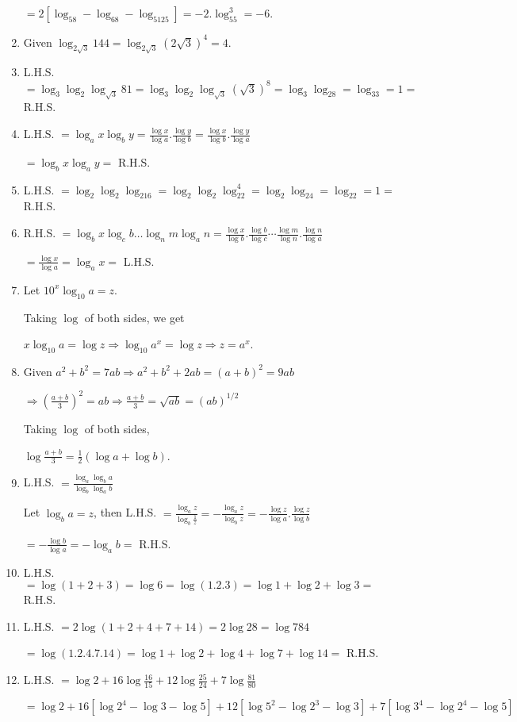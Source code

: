 \begin{enumerate}
  $= 2[\log_58 - \log_68 - \log_5125] = -2.\log_55^3 = -6$.
\item Given $\log_{2\sqrt{3}}144 = \log_{2\sqrt{3}}(2\sqrt{3})^4 = 4$.
\item L.H.S. $= \log_3\log_2\log_{\sqrt{3}}81 = \log_3\log_2\log_{\sqrt{3}}(\sqrt{3})^8 = \log_3\log_28 = \log_33 = 1 =$ R.H.S.
\item L.H.S. $= \log_ax\log_by = \frac{\log x}{\log a}.\frac{\log y}{\log b} = \frac{\log x}{\log b}.\frac{\log y}{\log a}$

  $= \log_bx\log_ay =$ R.H.S.
\item L.H.S. $= \log_2\log_2\log_216 = \log_2\log_2\log_22^4 = \log_2\log_24 = \log_22 = 1 =$ R.H.S.
\item R.H.S. $= \log_bx\log_cb\ldots\log_nm\log_an = \frac{\log x}{\log b}.\frac{\log b}{\log c}\cdots\frac{\log m}{\log
  n}.\frac{\log n}{\log a}$

  $= \frac{\log x}{\log a} = \log_ax =$ L.H.S.
\item Let $10^x\log_{10}a = z$.

  Taking $\log$ of both sides, we get

  $x\log_{10}a = \log z \Rightarrow \log_{10}a^x = \log z \Rightarrow z = a^x$.
\item Given $a^2 + b^2 = 7ab \Rightarrow a^2 + b^2 + 2ab = (a + b)^2 = 9ab$

  $\Rightarrow \left(\frac{a + b}{3}\right)^2 = ab \Rightarrow \frac{a + b}{3} = \sqrt{ab} = (ab)^{1/2}$

  Taking $\log$ of both sides,

  $\log \frac{a + b}{3} = \frac{1}{2}(\log a + \log b)$.
\item L.H.S. $= \frac{\log_a\log_ba}{\log_b\log_ab}$

  Let $\log_ba = z$, then L.H.S. $= \frac{\log_az}{\log_b\tfrac{1}{z}} = -\frac{\log_az}{\log_bz} = -\frac{\log z}{\log a}.\frac{\log z}{\log b}$

  $= - \frac{\log b}{\log a} = -\log_ab =$ R.H.S.
\item L.H.S. $= \log(1 + 2 + 3) = \log 6 = \log(1.2.3) = \log 1 + \log 2 + \log 3 =$ R.H.S.
\item L.H.S. $= 2\log(1 + 2 + 4 + 7 + 14) = 2\log 28 = \log 784$

  $= \log(1.2.4.7.14) = \log 1 + \log 2 + \log 4 + \log 7 + \log 14 =$ R.H.S.
\item L.H.S. $= \log 2 + 16\log\frac{16}{15} + 12\log\frac{25}{24} + 7\log\frac{81}{80}$

  $= \log 2 + 16[\log 2^4 - \log 3 - \log 5] + 12[\log 5^2 - \log 2^3 - \log 3] + 7[\log 3^4 - \log 2^4 - \log 5]$


\end{enumerate}
